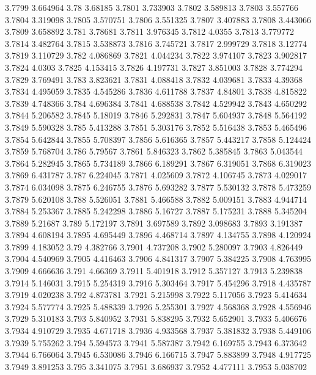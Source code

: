 3.7799  3.664964
3.78  3.68185
3.7801  3.733903
3.7802  3.589813
3.7803  3.557766
3.7804  3.319098
3.7805  3.570751
3.7806  3.551325
3.7807  3.407883
3.7808  3.443066
3.7809  3.658892
3.781  3.78681
3.7811  3.976345
3.7812  4.0355
3.7813  3.779772
3.7814  3.482764
3.7815  3.538873
3.7816  3.745721
3.7817  2.999729
3.7818  3.12774
3.7819  3.110729
3.782  4.086869
3.7821  4.044234
3.7822  3.974107
3.7823  3.902817
3.7824  4.0303
3.7825  4.153415
3.7826  4.197731
3.7827  3.851003
3.7828  3.774294
3.7829  3.769491
3.783  3.823621
3.7831  4.088418
3.7832  4.039681
3.7833  4.39368
3.7834  4.495059
3.7835  4.545286
3.7836  4.611788
3.7837  4.84801
3.7838  4.815822
3.7839  4.748366
3.784  4.696384
3.7841  4.688538
3.7842  4.529942
3.7843  4.650292
3.7844  5.206582
3.7845  5.18019
3.7846  5.292831
3.7847  5.604937
3.7848  5.564192
3.7849  5.590328
3.785  5.413288
3.7851  5.303176
3.7852  5.516438
3.7853  5.465496
3.7854  5.642844
3.7855  5.708397
3.7856  5.616365
3.7857  5.443217
3.7858  5.124424
3.7859  5.768704
3.786  5.79567
3.7861  5.846323
3.7862  5.385845
3.7863  5.043544
3.7864  5.282945
3.7865  5.734189
3.7866  6.189291
3.7867  6.319051
3.7868  6.319023
3.7869  6.431787
3.787  6.224045
3.7871  4.025609
3.7872  4.106745
3.7873  4.029017
3.7874  6.034098
3.7875  6.246755
3.7876  5.693282
3.7877  5.530132
3.7878  5.473259
3.7879  5.620108
3.788  5.526051
3.7881  5.466588
3.7882  5.009151
3.7883  4.944714
3.7884  5.253367
3.7885  5.242298
3.7886  5.16727
3.7887  5.175231
3.7888  5.345204
3.7889  5.21687
3.789  5.172197
3.7891  3.697589
3.7892  3.098683
3.7893  3.191387
3.7894  4.608194
3.7895  4.695449
3.7896  4.468714
3.7897  4.134755
3.7898  4.120924
3.7899  4.183052
3.79  4.382766
3.7901  4.737208
3.7902  5.280097
3.7903  4.826449
3.7904  4.540969
3.7905  4.416463
3.7906  4.841317
3.7907  5.384225
3.7908  4.763995
3.7909  4.666636
3.791  4.66369
3.7911  5.401918
3.7912  5.357127
3.7913  5.239838
3.7914  5.146031
3.7915  5.254319
3.7916  5.303464
3.7917  5.454296
3.7918  4.435787
3.7919  4.020238
3.792  4.873781
3.7921  5.215998
3.7922  5.117056
3.7923  5.414634
3.7924  5.577774
3.7925  5.488339
3.7926  5.255301
3.7927  4.568368
3.7928  4.556946
3.7929  5.310183
3.793  5.840952
3.7931  5.838295
3.7932  5.652901
3.7933  5.406676
3.7934  4.910729
3.7935  4.671718
3.7936  4.933568
3.7937  5.381832
3.7938  5.449106
3.7939  5.755262
3.794  5.594573
3.7941  5.587387
3.7942  6.169755
3.7943  6.373642
3.7944  6.766064
3.7945  6.530086
3.7946  6.166715
3.7947  5.883899
3.7948  4.917725
3.7949  3.891253
3.795  3.341075
3.7951  3.686937
3.7952  4.477111
3.7953  5.038702
